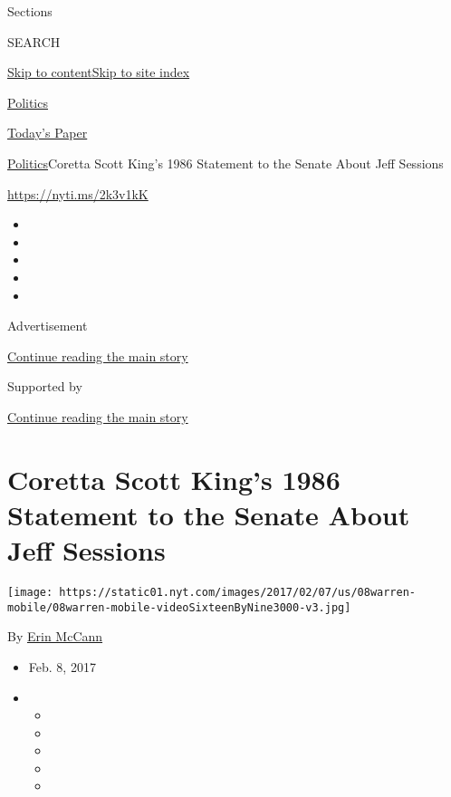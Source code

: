 Sections

SEARCH

\protect\hyperlink{site-content}{Skip to
content}\protect\hyperlink{site-index}{Skip to site index}

\href{https://www.nytimes.com/section/politics}{Politics}

\href{https://myaccount.nytimes.com/auth/login?response_type=cookie\&client_id=vi}{}

\href{https://www.nytimes.com/section/todayspaper}{Today's Paper}

\href{/section/politics}{Politics}\textbar{}Coretta Scott King's 1986
Statement to the Senate About Jeff Sessions

\url{https://nyti.ms/2k3v1kK}

\begin{itemize}
\item
\item
\item
\item
\item
\end{itemize}

Advertisement

\protect\hyperlink{after-top}{Continue reading the main story}

Supported by

\protect\hyperlink{after-sponsor}{Continue reading the main story}

\hypertarget{coretta-scott-kings-1986-statement-to-the-senate-about-jeff-sessions}{%
\section{Coretta Scott King's 1986 Statement to the Senate About Jeff
Sessions}\label{coretta-scott-kings-1986-statement-to-the-senate-about-jeff-sessions}}

\texttt{[image: https://static01.nyt.com/images/2017/02/07/us/08warren-mobile/08warren-mobile-videoSixteenByNine3000-v3.jpg]}

By \href{http://www.nytimes.com/by/erin-mccann}{Erin McCann}

\begin{itemize}
\item
  Feb. 8, 2017
\item
  \begin{itemize}
  \item
  \item
  \item
  \item
  \item
  \end{itemize}
\end{itemize}

